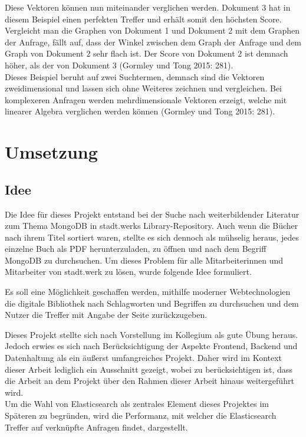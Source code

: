 \documentclass[a4paper]{scrartcl}
\begin{document}
Diese Vektoren können nun miteinander verglichen werden. Dokument 3 hat in diesem Beispiel einen perfekten Treffer und erhält somit den höchsten Score. Vergleicht man die Graphen von Dokument 1 und Dokument 2 mit dem Graphen der Anfrage, fällt auf, dass der Winkel zwischen dem Graph der Anfrage und dem Graph von Dokument 2 sehr flach ist. Der Score von Dokument 2 ist demnach höher, als der von Dokument 3 (Gormley und Tong 2015: 281). \\
Dieses Beispiel beruht auf zwei Suchtermen, demnach sind die Vektoren zweidimensional und lassen sich ohne Weiteres zeichnen und vergleichen. Bei komplexeren Anfragen werden mehrdimensionale Vektoren erzeigt, welche mit linearer Algebra verglichen werden können (Gormley und Tong 2015: 281).

\section{Umsetzung}

\subsection{Idee}
Die Idee für dieses Projekt entstand bei der Suche nach weiterbildender Literatur zum Thema MongoDB in stadt.werks Library-Repository. Auch wenn die Bücher nach ihrem Titel sortiert waren, stellte es sich dennoch als mühselig heraus, jedes einzelne Buch als PDF herunterzuladen, zu öffnen und nach dem Begriff MongoDB zu durchsuchen. Um dieses Problem für alle Mitarbeiterinnen und Mitarbeiter von stadt.werk zu lösen, wurde folgende Idee formuliert.

\begin{center}
	Es soll eine Möglichkeit geschaffen werden, mithilfe moderner Webtechnologien die digitale Bibliothek nach Schlagworten und Begriffen zu durchsuchen und dem Nutzer die Treffer mit Angabe der Seite zurückzugeben.
\end{center}

Dieses Projekt stellte sich nach Vorstellung im Kollegium als gute Übung heraus. Jedoch erwies es sich nach Berücksichtigung der Aspekte Frontend, Backend und Datenhaltung als ein äußerst umfangreiches Projekt. Daher wird im Kontext dieser Arbeit lediglich ein Ausschnitt gezeigt, wobei zu berücksichtigen ist, dass die Arbeit an dem Projekt über den Rahmen dieser Arbeit hinaus weitergeführt wird. \\
Um die Wahl von Elasticsearch als zentrales Element dieses Projektes im Späteren zu begründen, wird die Performanz, mit welcher die Elasticsearch Treffer auf verknüpfte Anfragen findet, dargestellt.
\end{document}
